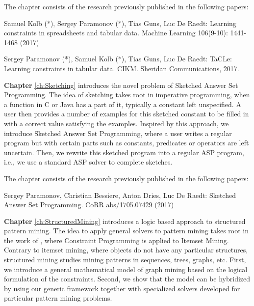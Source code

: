 The chapter consists of the research previously published in the following papers:

\begin{addmargin}[2em]{2em}
Samuel Kolb (*), Sergey Paramonov (*), Tias Guns, Luc De Raedt:
  Learning constraints in spreadsheets and tabular data. Machine
  Learning 106(9-10): 1441-1468 (2017)


Sergey Paramonov (*), Samuel Kolb (*), Tias Guns, Luc De Raedt:
TaCLe: Learning constraints in tabular data. CIKM. Sheridan
Communications, 2017.
\end{addmargin}


\textbf{Chapter} \ref{ch:Sketching} introduces the novel problem of
Sketched Answer Set Programming. The idea of sketching takes root in
imperative programming, when a function in C or Java has a part of it,
typically a constant left unspecified. A user then provides a number
of examples for this sketched constant to be filled in with a
correct value satisfying the examples. Inspired by this approach, we
introduce Sketched Answer Set Programming, where a user writes a
regular program but with certain parts such as constants, predicates
or operators are left uncertain. Then, we rewrite this sketched
program into a regular ASP program, i.e., we use a standard ASP solver
to complete sketches.


The chapter consists of the research previously published in the following papers:
\begin{addmargin}[2em]{2em}
  Sergey Paramonov, Christian Bessiere, Anton Dries, Luc De Raedt:
  Sketched Answer Set Programming. CoRR abs/1705.07429 (2017)
\end{addmargin}


\textbf{Chapter} \ref{ch:StructuredMining} introduces a logic
based approach to structured pattern mining. The idea to apply general
solvers to pattern mining takes root in the work of
\cite{declrativeapproach}, where Constraint Programming is applied to
Itemset Mining. Contrary to itemset mining, where objects do not have
any particular structures, structured mining studies mining patterns
in sequences, trees, graphs, etc. First, we introduce a general
mathematical model of graph mining based on the logical formulation of
the constraints. Second, we show that the model can be hybridized by
using our generic framework together with specialized solvers
developed for particular pattern mining problems.

